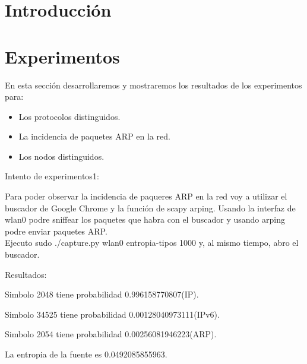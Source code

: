 \documentclass[a4paper]{article}
\begin{document}
\thispagestyle{empty}
\maketitle
\thispagestyle{empty}
\newpage

\tableofcontents

\newpage
\section{Introducción}


\newpage
\section{Experimentos}
%
En esta sección desarrollaremos y mostraremos los resultados de los experimentos para:

\begin{itemize}
\item Los protocolos distinguidos.
\item La incidencia de paquetes ARP en la red.
\item Los nodos distinguidos.
\end{itemize}

Intento de experimentos1:

Para poder observar la incidencia de paqueres ARP en la red voy a utilizar el buscador de Google Chrome y la función de scapy arping. Usando la interfaz de wlan0 podre sniffear
los paquetes que habra con el buscador y usando arping podre enviar paquetes ARP.\\

Ejecuto  sudo ./capture.py wlan0 entropia-tipos 1000 y, al mismo tiempo, abro el buscador. 

Resultados:

Simbolo 2048 tiene probabilidad 0.996158770807(IP).

Simbolo 34525 tiene probabilidad 0.00128040973111(IPv6).

Simbolo 2054 tiene probabilidad 0.00256081946223(ARP).

La entropia de la fuente es 0.0492085855963.
\end{document}

